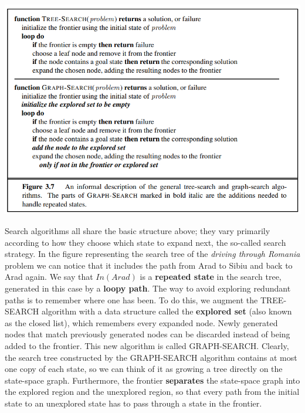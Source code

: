 \begin{center}
    \includegraphics[scale=0.8]{images/tree search2.png}
\end{center}
Search algorithms all share the basic structure above; they vary primarily according to how they choose which state to expand next, the so-called search strategy.\newline\newline
In the figure representing the search tree of the \textit{driving through Romania} problem we can notice that it includes the path from Arad to Sibiu and back to Arad again. We say that $In(Arad)$ is a \textbf{repeated state} in the search tree, generated in this case by a \textbf{loopy path}.\newline\newline
The way to avoid exploring redundant paths is to remember where one has been. To do this, we augment the TREE-SEARCH algorithm with a data structure called the \textbf{explored set} (also known as the closed list), which remembers every expanded node. Newly generated nodes
that match previously generated nodes can be discarded instead of being added to the frontier. This new algorithm is called GRAPH-SEARCH.\newline\newline
Clearly, the search tree constructed by the GRAPH-SEARCH algorithm contains at most one copy of each state, so we can think of it as growing a tree directly on the state-space graph. Furthermore, the frontier \textbf{separates} the state-space graph into the explored region and the unexplored region, so that every path from the initial state to an unexplored state has to pass through a state in the frontier.\newline\newline
